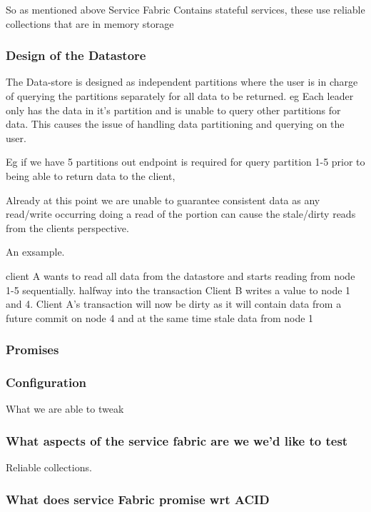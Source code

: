 \documentclass[a4paper,10pt,titlepage]{report}
\begin{document}
So as mentioned above Service Fabric Contains stateful services, these use reliable collections that are in memory storage

\subsubsection{Design of the Datastore}

The Data-store is designed as independent partitions where the user is in charge of querying the partitions separately for all data to be returned. eg Each leader only has the data in it's partition and is unable to query other partitions for data. This causes the issue of handling data partitioning and querying on the user.

Eg if we have 5 partitions out endpoint is required for query partition 1-5 prior to being able to return data to the client,

Already at this point we are unable to guarantee consistent data as any read/write occurring doing a read of the portion can cause the stale/dirty reads from the clients perspective.

An exsample.

client A wants to read all data from the datastore and starts reading from node 1-5 sequentially. halfway into the transaction Client B writes a value to node 1 and 4. Client A's transaction will now be dirty as it will contain data from a future commit on node 4 and at the same time stale data from node 1



\subsubsection{Promises}


\subsubsection{Configuration}


What we are able to tweak


\subsubsection{What aspects of the service fabric are we  we'd like to test}

Reliable collections.

\subsubsection{What does service Fabric promise wrt ACID}
\end{document}
